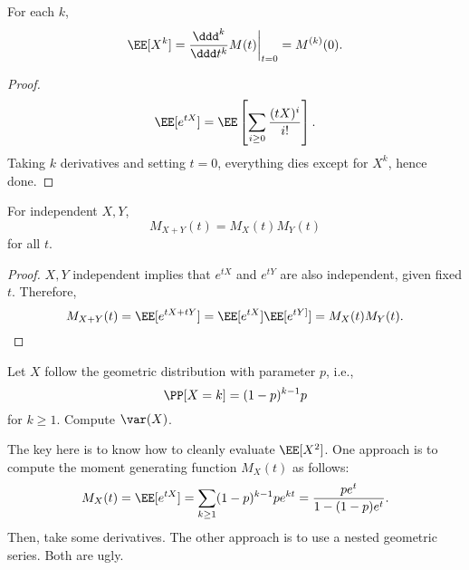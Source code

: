 \begin{theorem}
\lemlabel

For each $k$, 
\[\EE[X^k] = \frac{\ddd^k}{\ddd t^k}M(t)\bigg|_{t=0} = M^{(k)}(0).\]
\end{theorem}

\begin{proof}
\[\EE[e^{tX}] = \EE\left[\sum_{i\geq 0}\frac{(tX)^i}{i!}\right].\]
Taking $k$ derivatives and setting $t=0$, everything dies except for $X^k$, hence done.
\end{proof}

\begin{theorem}
\lemlabel

For independent $X,Y$, 
\[M_{X+Y}(t) = M_X(t)M_Y(t)\]
for all $t$. 
\end{theorem}

\begin{proof}
$X,Y$ independent implies that $e^{tX}$ and $e^{tY}$ are also independent, given fixed $t$. Therefore, 
\[M_{X+Y}(t) = \EE[e^{tX+tY}] = \EE[e^{tX}]\EE[e^{tY]}] = M_X(t)M_Y(t).\]
\end{proof}

\begin{example}
\exlabel

Let $X$ follow the geometric distribution with parameter $p$, i.e., 
\[\PP[X=k] = (1-p)^{k-1}p\]
for $k\geq 1$. Compute $\var(X)$. 
\end{example}

The key here is to know how to cleanly evaluate $\EE[X^2]$. One approach is to compute the moment generating function $M_X(t)$ as follows: 
\begin{align*}
    M_X(t) = \EE[e^{tX}] = \sum_{k\geq 1} (1-p)^{k-1}p e^{kt} = \frac{pe^t}{1-(1-p)e^t}.
\end{align*}
Then, take some derivatives. The other approach is to use a nested geometric series. Both are ugly.






